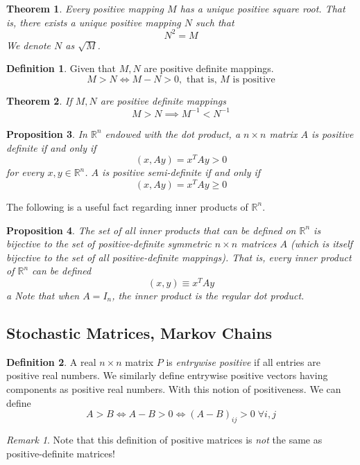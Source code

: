 \documentclass{article}
\newtheorem{theorem}{Theorem}[section]
\newtheorem{proposition}[theorem]{Proposition}
\theoremstyle{remark}
\newtheorem*{remark}{Remark}
\theoremstyle{definition}
\newtheorem{definition}{Definition}[section]
\begin{document}
\begin{theorem}
Every positive mapping $M$ has a unique positive square root. That is, there exists a unique positive mapping $N$ such that
\[ N^2 = M \]
We denote $N$ as $\sqrt{M}$. 
\end{theorem}

\begin{definition}
Given that $M, N$ are positive definite mappings. 
\[M > N \iff M - N > 0, \text{ that is, $M$ is positive}\]
\end{definition}

\begin{theorem}
If $M, N$ are positive definite mappings 
\[ M > N \implies M^{-1} < N^{-1}\]
\end{theorem}

\begin{proposition}
In $\mathbb{R}^n$ endowed with the dot product, a $n \times n$ matrix $A$ is positive definite if and only if 
\[(x, A y) = x^T A y > 0 \]
for every $x, y \in \mathbb{R}^n$. $A$ is positive semi-definite if and only if 
\[(x, A y) = x^T A y \geq 0\]
\end{proposition}

The following is a useful fact regarding inner products of $\mathbb{R}^n$. 
\begin{proposition}
The set of all inner products that can be defined on $\mathbb{R}^n$ is bijective to the set of positive-definite symmetric $n \times n$ matrices $A$ (which is itself bijective to the set of all positive-definite mappings). That is, every inner product of $\mathbb{R}^n$ can be defined 
\[(x, y) \equiv x^T A y\]a
Note that when $A = I_n$, the inner product is the regular dot product.
\end{proposition}

\subsection{Stochastic Matrices, Markov Chains}
\begin{definition}
A real $n \times n$ matrix $P$ is \textit{entrywise positive} if all entries are positive real numbers. We similarly define entrywise positive vectors having components as positive real numbers. With this notion of positiveness. We can define
\[A > B \iff A - B > 0 \iff (A-B)_{i j} > 0 \; \forall i, j\]
\end{definition}

\begin{remark}
Note that this definition of positive matrices is \textit{not} the same as positive-definite matrices! 
\end{remark}
\end{document}
